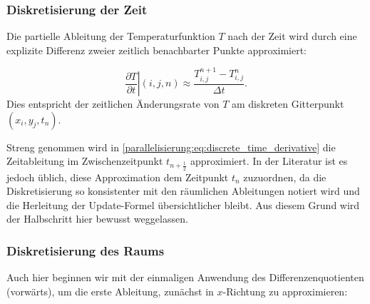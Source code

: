 \subsubsection{Diskretisierung der Zeit}

Die partielle Ableitung der Temperaturfunktion \( T \) nach der Zeit wird durch eine explizite Differenz zweier zeitlich benachbarter Punkte approximiert:

\begin{equation}
	\label{parallelisierung:eq:discrete_time_derivative}
	\left. \frac{\partial T}{\partial t}\right|{(i,j,n)}
	\approx
	\frac{T_{i,j}^{n+1} - T_{i,j}^n}{\Delta t}.
\end{equation}
Dies entspricht der zeitlichen Änderungsrate von \(T\) am diskreten Gitterpunkt \((x_i, y_j, t_n)\).

Streng genommen wird in \eqref{parallelisierung:eq:discrete_time_derivative}
die Zeitableitung im Zwischenzeitpunkt \(t_{n+\frac{1}{2}}\) approximiert. 
In der Literatur ist es jedoch üblich, diese Approximation dem Zeitpunkt \(t_n\) zuzuordnen, 
da die Diskretisierung so konsistenter mit den räumlichen Ableitungen notiert wird und die 
Herleitung der Update-Formel übersichtlicher bleibt. 
Aus diesem Grund wird der Halbschritt hier bewusst weggelassen.


\subsubsection{Diskretisierung des Raums}
Auch hier beginnen wir mit der einmaligen Anwendung des Differenzenquotienten (vorwärts), um die erste Ableitung, zunächst in $x$-Richtung zu approximieren:

